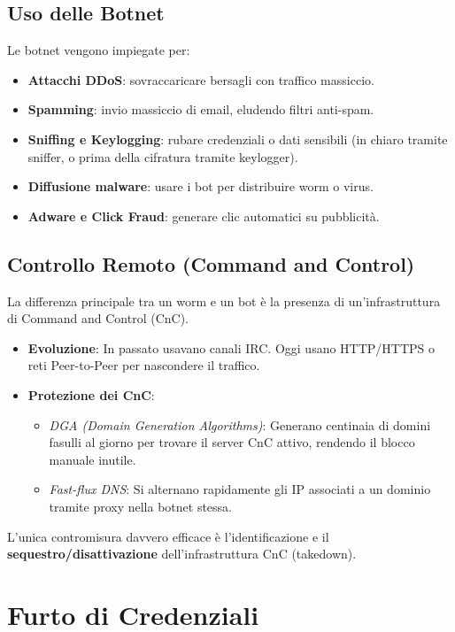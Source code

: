 \subsection{Uso delle Botnet}
Le botnet vengono impiegate per:
\begin{itemize}
    \item \textbf{Attacchi DDoS}: sovraccaricare bersagli con traffico massiccio.
    \item \textbf{Spamming}: invio massiccio di email, eludendo filtri anti-spam.
    \item \textbf{Sniffing e Keylogging}: rubare credenziali o dati sensibili (in chiaro tramite sniffer, o prima della cifratura tramite keylogger).
    \item \textbf{Diffusione malware}: usare i bot per distribuire worm o virus.
    \item \textbf{Adware e Click Fraud}: generare clic automatici su pubblicità.
\end{itemize}

\subsection{Controllo Remoto (Command and Control)}
La differenza principale tra un worm e un bot è la presenza di un'infrastruttura di Command and Control (CnC).
\begin{itemize}
    \item \textbf{Evoluzione}: In passato usavano canali IRC. Oggi usano HTTP/HTTPS o reti Peer-to-Peer per nascondere il traffico.
    \item \textbf{Protezione dei CnC}:
    \begin{itemize}
        \item \textit{DGA (Domain Generation Algorithms)}: Generano centinaia di domini fasulli al giorno per trovare il server CnC attivo, rendendo il blocco manuale inutile.
        \item \textit{Fast-flux DNS}: Si alternano rapidamente gli IP associati a un dominio tramite proxy nella botnet stessa.
    \end{itemize}
\end{itemize}

L'unica contromisura davvero efficace è l'identificazione e il \textbf{sequestro/disattivazione} dell'infrastruttura CnC (takedown).

\section{Furto di Credenziali}

